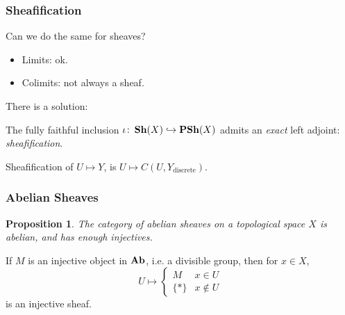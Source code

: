 \documentclass{beamer}
\newtheorem{proposition}{Proposition}
\begin{document}
\begin{frame}
    \frametitle{Sheafification}

    \begin{center}
        Can we do the same for sheaves?
    \end{center}
    \pause
    \begin{itemize}
        \item Limits: ok.
        \item Colimits: not always a sheaf.
    \end{itemize}
    There is a solution:
    \pause
    \begin{theorem}
        The fully faithful inclusion $\iota \colon \operatorname{\mathbf{Sh}}(X) \hookrightarrow \operatorname{\mathbf{PSh}}(X)$
        admits an \emph{exact} left adjoint: \emph{sheafification}.
    \end{theorem}
    \begin{example}
        Sheafification of $U \mapsto Y$, is $U \mapsto C(U, Y_{\text{discrete}})$.
    \end{example}

\end{frame}

\begin{frame}
    \frametitle{Abelian Sheaves}

    \begin{proposition}
        The category of abelian sheaves on a topological space $X$
        is abelian, and has enough injectives.
    \end{proposition}

    \begin{example}
        If $M$ is an injective object in $\operatorname{\mathbf{Ab}}$, i.e. a divisible group,
        then for $x\in X$,
        \begin{equation*}
            U \mapsto
            \begin{cases}
                M     & x \in U    \\
                \{*\} & x \notin U
            \end{cases}
        \end{equation*}
        is an injective sheaf.
    \end{example}

\end{frame}
\end{document}
